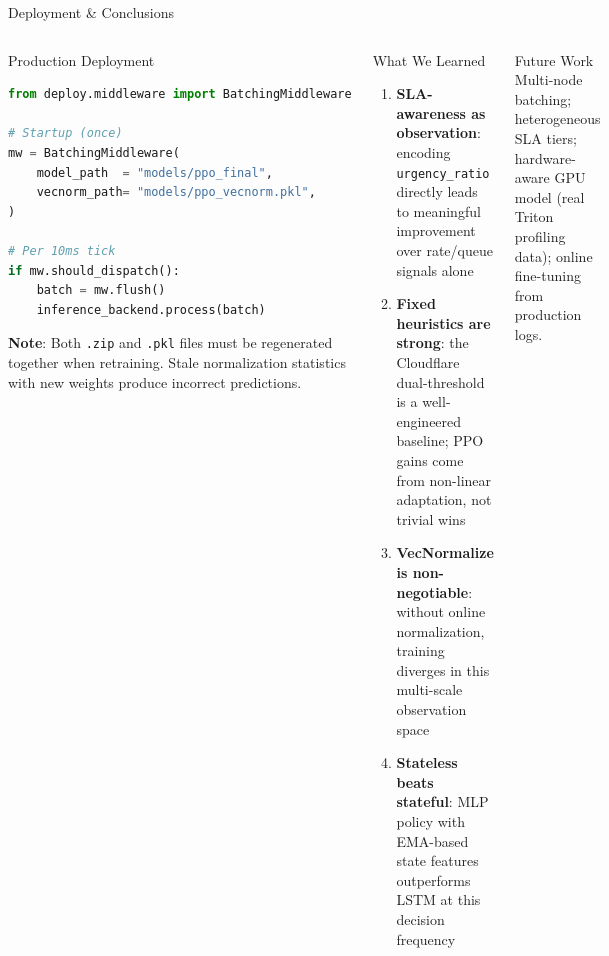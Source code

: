 \documentclass[aspectratio=169]{beamer}
\begin{document}
\begin{frame}{Deployment \& Conclusions}
  \begin{columns}[T]
      \begin{block}{Production Deployment}
        \begin{lstlisting}[language=Python]
from deploy.middleware import BatchingMiddleware

# Startup (once)
mw = BatchingMiddleware(
    model_path  = "models/ppo_final",
    vecnorm_path= "models/ppo_vecnorm.pkl",
)

# Per 10ms tick
if mw.should_dispatch():
    batch = mw.flush()
    inference_backend.process(batch)
        \end{lstlisting}
        \textbf{Note}: Both \texttt{.zip} and \texttt{.pkl} files must
        be regenerated together when retraining.  Stale normalization
        statistics with new weights produce incorrect predictions.
      \end{block}

      \begin{block}{What We Learned}
        \begin{enumerate}\itemsep4pt
          \item \textbf{SLA-awareness as observation}: encoding
                \texttt{urgency\_ratio} directly leads to meaningful
                improvement over rate/queue signals alone
          \item \textbf{Fixed heuristics are strong}: the Cloudflare
                dual-threshold is a well-engineered baseline;
                PPO gains come from non-linear adaptation, not trivial wins
          \item \textbf{VecNormalize is non-negotiable}: without
                online normalization, training diverges in this
                multi-scale observation space
          \item \textbf{Stateless beats stateful}: MLP policy with
                EMA-based state features outperforms LSTM at this
                decision frequency
        \end{enumerate}
      \end{block}
      \begin{alertblock}{Future Work}
        \scriptsize
        Multi-node batching; heterogeneous SLA tiers; hardware-aware
        GPU model (real Triton profiling data); online fine-tuning
        from production logs.
      \end{alertblock}
  \end{columns}
\end{frame}

\end{document}

